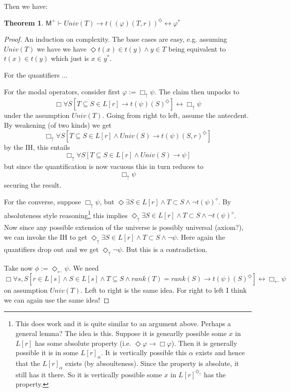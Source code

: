 \documentclass{article}
\newtheorem{Theorem}{Theorem}[section]
\theoremstyle{definition}
\newcommand{\du}{\Diamond_\uparrow}
\newcommand{\dl}{\Diamond_\leftarrow}
\newcommand{\bu}{\Box_\uparrow}
\newcommand{\bl}{\Box_\leftarrow}
\begin{document}
Then we have:
\begin{Theorem}
    $\mathsf{M}^+ \vdash Univ(T) \rightarrow t((\varphi)(T, r))^\Diamond \leftrightarrow \varphi^*$
\end{Theorem}
\begin{proof}
    An induction on complexity. The base cases are easy, e.g. assuming $Univ(T)$ we have
    we have $\Diamond t(x) \in t(y) \wedge y \in T$ 
    being equivalent to $t(x) \in t(y)$ which just is $x \in y^*$.
    
    For the quantifiers ... 
    
    For the modal operators, consider first $\varphi := \bu \psi$. The claim then unpacks to
    \[ \Box \forall S [T \subseteq S \in L[r] \rightarrow t(\psi)(S)^\Diamond] \leftrightarrow \bu \psi
    \]
    under the assumption $Univ(T)$. Going from right to left, assume the antecdent. 
    By weakening (of two kinds)  
    we get  
    \[ \bu \forall S [T \subseteq S \in L[r] \wedge Univ(S) \rightarrow t(\psi)(S, r)^\Diamond]
    \]
    by the IH, this  entails
    \[ \bu \forall S [T \subseteq S \in L[r] \wedge Univ(S) \rightarrow \psi] 
    \]
    but since the quantification is now vacuous this in turn reduces to 
    \[ \bu  \psi 
    \]
    securing the result. 

    For the converse, suppose $\bu \psi$, but $\Diamond \exists S \in L[r] \wedge T \subset S \wedge \neg t(\psi)^\diamond$.
    By absoluteness style reasoning\footnote{
        This does work and it is quite similar to an argument above. Perhaps a general lemma?
        The idea is this. Suppose it is genearlly possible some $x$ in $L[r]$ has some 
        absolute property (i.e. $\Diamond \varphi \rightarrow \Box \varphi$). 
        Then it is generally possible it is in some $L[r]_\alpha$. It is vertically possible 
        this $\alpha$ exists and hence that the $L[r]_\alpha$ exists (by absoulteness). 
        Since the property is absolute, it still has it there. So it is vertically possible 
        some $x$ in $L[r]^{\du}$ has the property. 
    } this implies $\du \exists S \in L[r] \wedge T \subset S \wedge \neg t(\psi)^\diamond$.
    Now since any possible extension of the universe is possibly universal (axiom?), we 
    can invoke the IH to get $\du \exists S \in L[r] \wedge T \subset S \wedge \neg \psi$.
    Here again the quantifiers drop out and we get $\du \neg \psi$. But this is a contradiction.

    Take now $\phi := \dl \psi$. We need
    \[ \Box \forall s, S[r \in L[s] \wedge S \in L[s] \wedge T \subseteq S \wedge rank(T) = rank(S) \rightarrow t(\psi)(S)^\Diamond] \leftrightarrow \bl \psi
    \]
    on assumption $Univ(T)$. Left to right is the same idea. 
    For right to left I think we can again use the same idea!
\end{proof}
\end{document}
